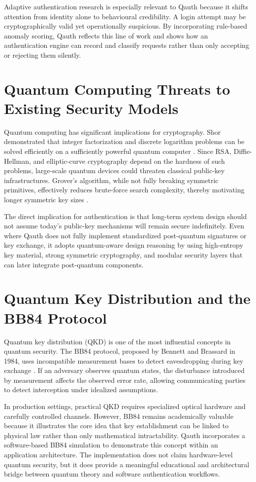 Adaptive authentication research is especially relevant to Qauth because it shifts attention from identity alone to behavioural credibility. A login attempt may be cryptographically valid yet operationally suspicious. By incorporating rule-based anomaly scoring, Qauth reflects this line of work and shows how an authentication engine can record and classify requests rather than only accepting or rejecting them silently.

\section{Quantum Computing Threats to Existing Security Models}
Quantum computing has significant implications for cryptography. Shor demonstrated that integer factorization and discrete logarithm problems can be solved efficiently on a sufficiently powerful quantum computer \cite{shor1994}. Since RSA, Diffie-Hellman, and elliptic-curve cryptography depend on the hardness of such problems, large-scale quantum devices could threaten classical public-key infrastructures. Grover's algorithm, while not fully breaking symmetric primitives, effectively reduces brute-force search complexity, thereby motivating longer symmetric key sizes \cite{grover1996}.

The direct implication for authentication is that long-term system design should not assume today’s public-key mechanisms will remain secure indefinitely. Even where Qauth does not fully implement standardized post-quantum signatures or key exchange, it adopts quantum-aware design reasoning by using high-entropy key material, strong symmetric cryptography, and modular security layers that can later integrate post-quantum components.

\section{Quantum Key Distribution and the BB84 Protocol}
Quantum key distribution (QKD) is one of the most influential concepts in quantum security. The BB84 protocol, proposed by Bennett and Brassard in 1984, uses incompatible measurement bases to detect eavesdropping during key exchange \cite{bb84}. If an adversary observes quantum states, the disturbance introduced by measurement affects the observed error rate, allowing communicating parties to detect interception under idealized assumptions.

In production settings, practical QKD requires specialized optical hardware and carefully controlled channels. However, BB84 remains academically valuable because it illustrates the core idea that key establishment can be linked to physical law rather than only mathematical intractability. Qauth incorporates a software-based BB84 simulation to demonstrate this concept within an application architecture. The implementation does not claim hardware-level quantum security, but it does provide a meaningful educational and architectural bridge between quantum theory and software authentication workflows.

